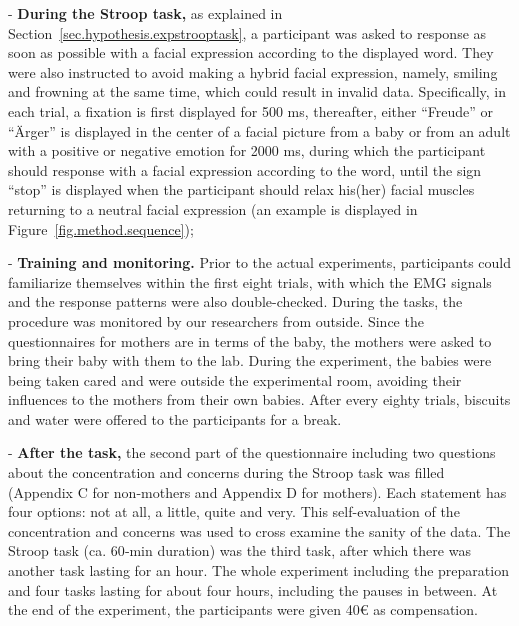 \noindent - \textbf{During the Stroop task,}
as explained in Section~\ref{sec.hypothesis.expstrooptask},
a participant was asked to response as soon as possible with a facial expression according to
the displayed word. They were also instructed to avoid making a hybrid
facial expression, namely, smiling and frowning at the same time,
which could result in invalid data.
Specifically, in each trial,
a fixation is first displayed for 500 ms,
thereafter, either ``Freude'' or ``Ärger'' is displayed in the center of 
a facial picture from a baby or from an adult with a positive or negative 
emotion for 2000 ms, during which the participant should response with 
a facial expression according to the word, until the sign ``stop'' is displayed when the participant should 
relax his(her) facial muscles returning to a neutral facial expression (an example is
displayed in Figure~\ref{fig.method.sequence});

\noindent - \textbf{Training and monitoring.}
Prior to the actual experiments, 
participants could familiarize themselves within the 
first eight trials, with which the EMG signals and the 
response patterns were also double-checked. 
During the tasks,
the procedure was monitored by our researchers from outside. Since the questionnaires for mothers are in terms of the baby, the mothers were asked to bring their baby with them to the lab. During the experiment, the babies were being taken cared and were outside the experimental room, avoiding 
their influences to the mothers from their own babies.
After every eighty trials, 
biscuits and water were offered to the participants for a break.


\noindent - \textbf{After the task,}
the second part of the questionnaire including two questions about the concentration and concerns during the Stroop task was filled (Appendix C for non-mothers and Appendix D for mothers). Each statement has four options: not at all, a little, quite and very. This self-evaluation of the concentration and concerns was used to cross examine the sanity of the data. The Stroop task (ca. 60‐min duration) was the third task, after which there was another task lasting for an hour. The whole experiment including the preparation and four tasks lasting for about four hours, including the pauses in between. At the end of the experiment, the participants were given 40€ as compensation.

